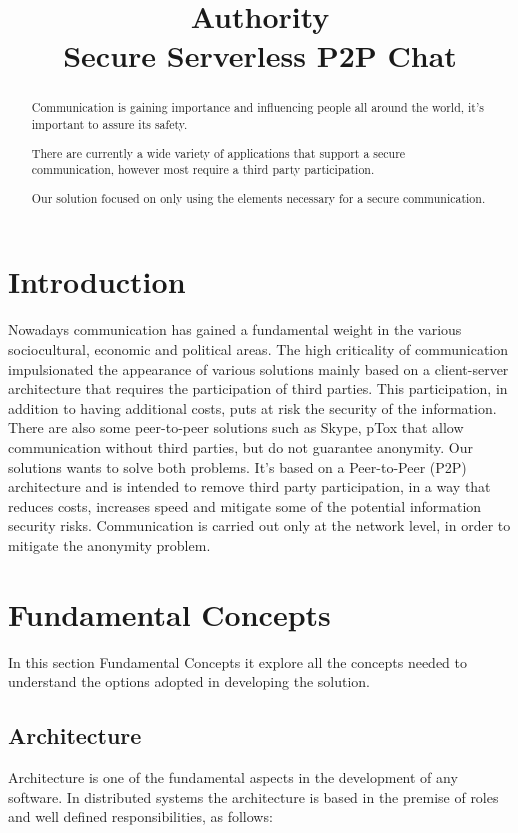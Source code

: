 \documentclass[extendedabs]{recpad2k}
\title{Authority\\ Secure Serverless P2P Chat}
\begin{document}
\maketitle

\begin{abstract}

Communication is gaining importance and influencing people all around the world, it's important to assure its safety.

There are currently a wide variety of applications that support a secure communication, however most require a third party participation.

Our solution focused on only using the elements necessary for a secure communication.
\end{abstract}

\section{Introduction } 
\label{sec:intro}

Nowadays communication has gained a fundamental weight in the various sociocultural, economic and political areas. The high criticality of communication impulsionated the appearance of various solutions mainly based on a client-server architecture that requires the participation of third parties. This participation, in addition to having additional costs, puts at risk the security of the information. There are also some peer-to-peer solutions such as Skype, pTox that allow communication without third parties, but do not guarantee anonymity. Our solutions wants to solve both problems. It's based on a Peer-to-Peer (P2P) architecture and is intended to remove third party participation, in a way that reduces costs, increases speed and mitigate some of the potential information security risks. Communication is carried out only at the network level, in order to mitigate the anonymity problem.

\section{Fundamental Concepts}
\label{sec:Fundamental Concepts}
In this section Fundamental Concepts it explore all the concepts needed to understand the options adopted in developing the solution.

\subsection{Architecture}
Architecture is one of the fundamental aspects in the development of any software.
In distributed systems the architecture is based in the premise of roles and well defined responsibilities, as follows:
\end{document}
